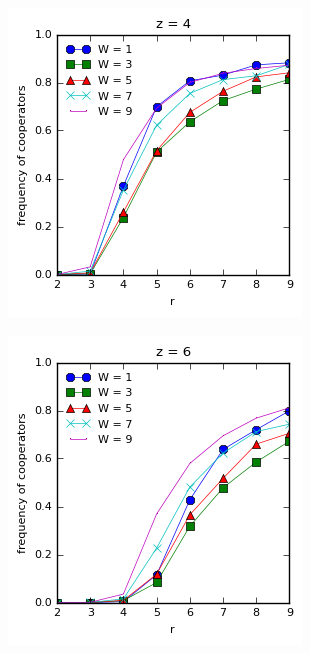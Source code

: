 \documentclass{article}
\begin{document}
		\begin{figure}[h]
		\centering
		\begin{subfigure}[b]{0.4\textwidth}
			\includegraphics[width=\textwidth]{fig/dynamic/pswitch-z4.png}
			\caption{}
		\end{subfigure}
		\begin{subfigure}[b]{0.4\textwidth}
			\includegraphics[width=\textwidth]{fig/dynamic/pswitch-z6.png}

\end{subfigure}
\end{figure}
\end{document}
